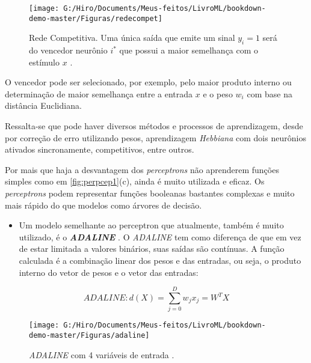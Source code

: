 \documentclass[
  openany]{book}
\providecommand{\tightlist}{%
  \setlength{\itemsep}{0pt}\setlength{\parskip}{0pt}}
\begin{document}
\begin{figure}

{\centering \texttt{[image: G:/Hiro/Documents/Meus-feitos/LivroML/bookdown-demo-master/Figuras/redecompet]} 

}

\caption{Rede Competitiva. Uma única saída que emite um sinal \(y_i=1\) será do vencedor neurônio \(i^*\) que possui a maior semelhança com o estímulo \(x\)
\citep{rauber2005redes}.}\label{fig:redecompet}
\end{figure}




O vencedor pode ser selecionado, por exemplo, pelo maior produto interno ou determinação de maior semelhança entre a entrada \(x\) e o peso \(w_i\) com base na distância Euclidiana.

Ressalta-se que pode haver diversos métodos e processos de aprendizagem, desde por correção de erro utilizando pesos, aprendizagem \emph{Hebbiana} com dois neurônios ativados sincronamente, competitivos, entre outros.

Por mais que haja a desvantagem dos \emph{perceptrons} não aprenderem funções simples como em \ref{fig:perpcep1}(c), ainda é muito utilizada e eficaz. Os \emph{perceptrons} podem representar funções booleanas bastantes complexas e muito mais rápido do que modelos como árvores de decisão.

\begin{itemize}
\tightlist
\item
  Um modelo semelhante ao perceptron que atualmente, também é muito utilizado, é o \textbf{\emph{ADALINE}} \citep{widrow1960adaptive}. O \emph{ADALINE} tem como diferença de que em vez de estar limitada a valores binários, suas saídas são contínuas. A função calculada é a combinação linear dos pesos e das entradas, ou seja, o produto interno do vetor de pesos e o vetor das entradas:
\end{itemize}

\begin{equation} 
  ADALINE: d(X)=\displaystyle \sum^D_{j=0}w_j x_j = W^T X
  \label{eq:adaline}
\end{equation}

\begin{figure}

{\centering \texttt{[image: G:/Hiro/Documents/Meus-feitos/LivroML/bookdown-demo-master/Figuras/adaline]} 

}

\caption{\emph{ADALINE} com 4 variáveis de entrada \citep{rauber2005redes}.}\label{fig:adaline}
\end{figure}
\end{document}
